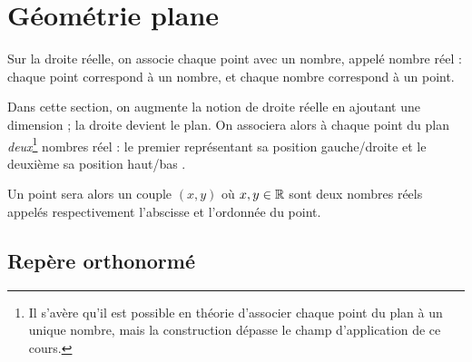 
\section{Géométrie plane}\label{sec:geom-plane}

Sur la droite réelle, on associe chaque point avec un nombre, appelé nombre réel : chaque point correspond à un nombre, et chaque nombre correspond à un point.

Dans cette section, on augmente la notion de droite réelle en ajoutant une dimension ; la droite devient le plan.
On associera alors à chaque point du plan \emph{deux}\footnote{Il s'avère qu'il est possible en théorie d'associer chaque point du plan à un unique nombre, mais la construction dépasse le champ d'application de ce cours.} nombres réel : le premier représentant sa position \og gauche/droite \fg et le deuxième sa position \og haut/bas \fg.

Un point sera alors un couple $(x,y)$ où $x,y \in \mathbb{R}$ sont deux nombres réels appelés respectivement l'abscisse et l'ordonnée du point.

\subsection{Repère orthonormé}


